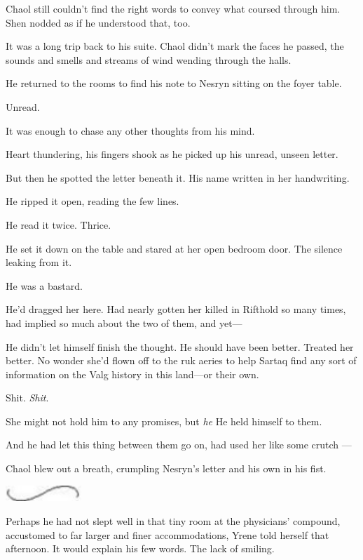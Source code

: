Chaol still couldn't find the right words to convey what coursed through him.
Shen nodded as if he understood that, too.

It was a long trip back to his suite.
Chaol didn't mark the faces he passed, the sounds and smells and streams of wind wending through the halls.

He returned to the rooms to find his note to Nesryn sitting on the foyer table.

Unread.

It was enough to chase any other thoughts from his mind.

Heart thundering, his fingers shook as he picked up his unread, unseen letter.

But then he spotted the letter beneath it.
His name written in her handwriting.

He ripped it open, reading the few lines.

He read it twice.
Thrice.

He set it down on the table and stared at her open bedroom door.
The silence leaking from it.

He was a bastard.

He'd dragged her here.
Had nearly gotten her killed in Rifthold so many times, had implied so much about the two of them, and yet---

He didn't let himself finish the thought.
He should have been better.
Treated her better.
No wonder she'd flown off to the ruk aeries to help Sartaq find any sort of information on the Valg history in this land---or their own.

Shit.
\emph{Shit}.

She might not hold him to any promises, but \emph{he}  He held himself to them.

And he had let this thing between them go on, had used her like some crutch ---

Chaol blew out a breath, crumpling Nesryn's letter and his own in his fist.

\begin{center}
	\includegraphics[width=1.12in,height=0.24in]{images/seperator}
\end{center}

Perhaps he had not slept well in that tiny room at the physicians' compound, accustomed to far larger and finer accommodations, Yrene told herself that afternoon.
It would explain his few words.
The lack of smiling.

